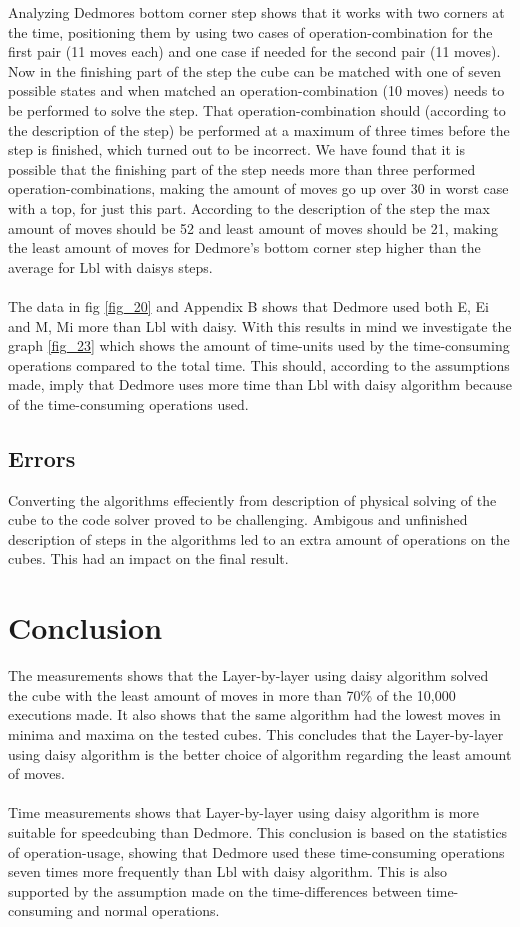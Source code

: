 \documentclass[a4paper,11pt]{kth-mag}
\begin{document}
Analyzing Dedmores bottom corner step shows that it works with two corners at the time, positioning them by using two cases of operation-combination for the first pair (11 moves each) and one case if needed for the second pair (11 moves). Now in the finishing part of the step the cube can be matched with one of seven possible states and when matched an operation-combination (10 moves) needs to be performed to solve the step. That operation-combination should (according to the description of the step) be performed at a maximum of three times before the step is finished, which turned out to be incorrect. We have found that it is possible that the finishing part of the step needs more than three performed operation-combinations, making the amount of moves go up over 30 in worst case with a top, for just this part. According to the description of the step the max amount of moves should be 52 and least amount of moves should be 21, making the least amount of moves for Dedmore's bottom corner step higher than the average for Lbl with daisys steps.\\\\   
The data in fig \ref{fig_20} and Appendix B shows that Dedmore used both E, Ei and M, Mi more than Lbl with daisy. With this results in mind we investigate the graph \ref{fig_23} which shows the amount of time-units used by the time-consuming operations compared to the total time. This should, according to the assumptions made, imply that Dedmore uses more time than Lbl with daisy algorithm because of the time-consuming operations used.   		     


\section{Errors}
Converting the algorithms effeciently from description of physical solving of the cube to the code solver proved to be challenging. Ambigous and unfinished description of steps in the algorithms led to an extra amount of operations on the cubes. This had an impact on the final result.

      

\chapter{Conclusion}
The measurements shows that the Layer-by-layer using daisy algorithm solved the cube with the least amount of moves in more than 70\% of the 10,000 executions made. It also shows that the same algorithm had the lowest moves in minima and maxima on the tested cubes. This concludes that the Layer-by-layer using daisy algorithm is the better choice of algorithm regarding the least amount of moves.\\\\
Time measurements shows that Layer-by-layer using daisy algorithm is more suitable for speedcubing than Dedmore. This conclusion is based on the statistics of operation-usage, showing that Dedmore used these time-consuming operations seven times more frequently than Lbl with daisy algorithm.
This is also supported by the assumption made on the time-differences between time-consuming and normal operations.
\end{document}

